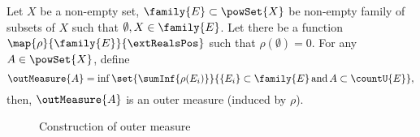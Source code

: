 \begin{Theorem}[name=Constructing outer measure]\label{thm:constr_out_measure}
    Let $X$ be a non-empty set, $\family{E}\subset\powSet{X}$ be non-empty family of subsets of $X$
    such that $\emptyset,X \in \family{E}$. Let there be a function
    $\map{\rho}{\family{E}}{\extRealsPos}$ such that $\rho(\emptyset) = 0$. For any $A \in
    \powSet{X}$, define
    \[\outMeasure{A} = \inf\set{\sumInf{\rho(E_i)}}{\lbrace E_i \rbrace \subset
	    \family{E}\,\text{and}\,A\subset\countU{E}},\]
    then, $\outMeasure{A}$ is an outer measure (induced by $\rho$).
\end{Theorem}

\begin{figure}
  
  \caption{Construction of outer measure}\label{fig:tikz:construct_out_measure}
\end{figure}

